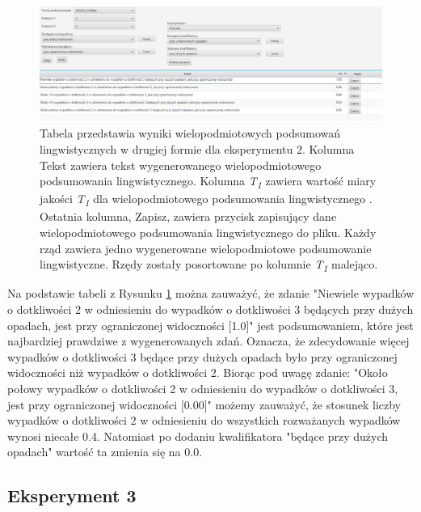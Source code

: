 \documentclass{classrep}
\begin{document}
\begin{figure}[h!]
\centering
\includegraphics[width=15cm]{ex_wiel2_2.png}
\vspace{-0.3cm}
\caption{Tabela przedstawia wyniki wielopodmiotowych podsumowań lingwistycznych w drugiej formie dla eksperymentu 2. Kolumna Tekst zawiera tekst wygenerowanego wielopodmiotowego podsumowania lingwistycznego. Kolumna \textit{T\textsubscript{1}} zawiera wartość miary jakości \textit{T\textsubscript{1}} dla wielopodmiotowego podsumowania lingwistycznego \cite{niewiadomski19}. Ostatnia kolumna, Zapisz, zawiera przycisk zapisujący dane wielopodmiotowego podsumowania lingwistycznego do pliku. Każdy rząd zawiera jedno wygenerowane wielopodmiotowe podsumowanie lingwistyczne. Rzędy zostały posortowane po kolumnie \textit{T\textsubscript{1}} malejąco. }
\label{wykr_ex_wiel2_2}
\end{figure}



Na podstawie tabeli z Rysunku \ref{wykr_ex_wiel2_2} można zauważyć, że zdanie "Niewiele wypadków o dotkliwości 2 w odniesieniu do wypadków o dotkliwości 3 będących przy dużych opadach, jest przy ograniczonej widoczności [1.0]" jest podsumowaniem, które jest najbardziej prawdziwe z wygenerowanych zdań. Oznacza, że zdecydowanie więcej wypadków o dotkliwości 3 będące przy dużych opadach było przy ograniczonej widoczności niż wypadków o dotkliwości 2. Biorąc pod uwagę zdanie: "Około połowy wypadków o dotkliwości 2 w odniesieniu do wypadków o dotkliwości 3, jest przy ograniczonej widoczności [0.00]" możemy zauważyć, że stosunek liczby wypadków o dotkliwości 2 w odniesieniu do wszystkich rozważanych wypadków wynosi niecałe 0.4. Natomiast po dodaniu kwalifikatora "będące przy dużych opadach" wartość ta zmienia się na 0.0.





\newpage
\subsection{Eksperyment 3}
\label{section:ex_wiel3}
\end{document}
